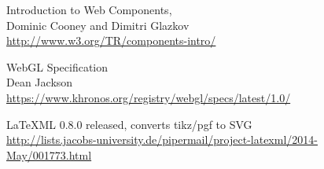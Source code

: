 \begin{thebibliography}{8}
Introduction to Web Components, \\
Dominic Cooney and Dimitri Glazkov \\
\href{http://www.w3.org/TR/components-intro/}{http://www.w3.org/TR/components-intro/}

WebGL Specification \\
Dean Jackson \\
\href{https://www.khronos.org/registry/webgl/specs/latest/1.0/}{https://www.khronos.org/registry/webgl/specs/latest/1.0/}

LaTeXML 0.8.0 released, converts tikz/pgf to SVG \\
\href{http://lists.jacobs-university.de/pipermail/project-latexml/2014-May/001773.html}{http://lists.jacobs-university.de/pipermail/project-latexml/2014-May/001773.html}

\end{thebibliography}
